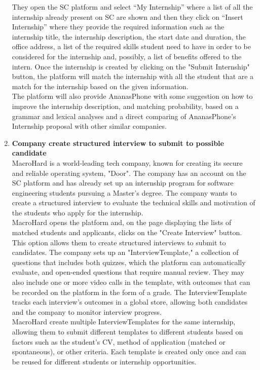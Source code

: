 \begin{enumerate}
        They open the SC platform and select “My Internship” where a list of all the internship already present on SC are shown and then they click on “Insert Internship” where they provide the required information such as the internship title, the internship description, the start date and duration, the office address, a list of the required skills student need to have in order to be considered for the internship and, possibly, a list of benefits offered to the intern.  Once the internship is created by clicking on the "Submit Internship" button, the platform will match the internship with all the student that are a match for the internship based on the given information.\\
        The platform will also provide AnanasPhone with some suggestion on how to improve the internship description, and matching probability, based on a grammar and lexical analyses and a direct comparing of AnanasPhone's Internship proposal with other similar companies.
    \item \textbf{Company create structured interview to submit to possible candidate}\\
        MacroHard is a world-leading tech company, known for creating its secure and reliable operating system, "Door". The company has an account on the SC platform and has already set up an internship program for software engineering students pursuing a Master’s degree. The company wants to create a structured interview to evaluate the technical skills and motivation of the students who apply for the internship.\\
        MacroHard opens the platform and, on the page displaying the lists of matched students and applicants, clicks on the "Create Interview" button. This option allows them to create structured interviews to submit to candidates. The company sets up an "InterviewTemplate," a collection of questions that includes both quizzes, which the platform can automatically evaluate, and open-ended questions that require manual review. They may also include one or more video calls in the template, with outcomes that can be recorded on the platform in the form of a grade. The InterviewTemplate tracks each interview’s outcomes in a global store, allowing both candidates and the company to monitor interview progress.\\
        MacroHard create multiple InterviewTemplates for the same internship, allowing them to submit different templates to different students based on factors such as the student’s CV, method of application (matched or spontaneous), or other criteria. Each template is created only once and can be reused for different students or internship opportunities.\\

\end{enumerate}
